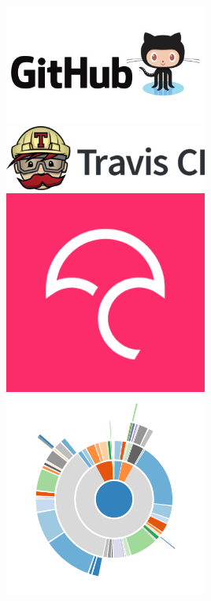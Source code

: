 \documentclass[trans]{beamer}
\begin{document}
{  \vspace{0.5cm}  
  
  \begin{minipage}{1\textwidth}
  \begin{columns}
  \includegraphics[width=0.5\textwidth]{github-logo.jpg}
  \includegraphics[width=0.5\textwidth]{travisci-logo.png}
  \includegraphics[width=0.5\textwidth]{codecov-logo.png}
  \includegraphics[width=0.5\textwidth]{quantifiedcode-logo.png}
  \end{columns}
  \end{minipage}
}
\end{document}
